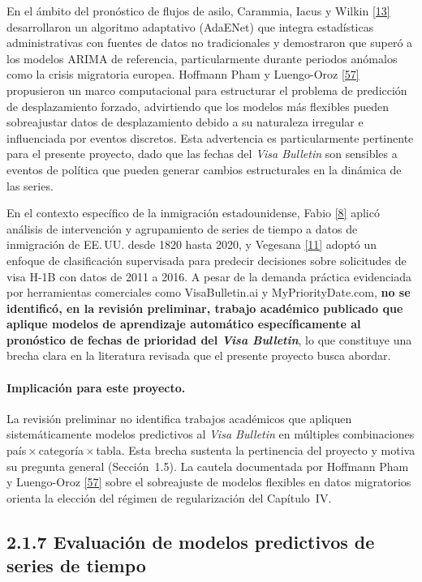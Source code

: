 \documentclass[12pt,letterpaper]{report}
\newcommand{\cita}[1]{\hyperref[bib:#1]{[#1]}}
\begin{document}
En el ámbito del pronóstico de flujos de asilo, Carammia, Iacus y Wilkin \cita{13} desarrollaron un algoritmo adaptativo (AdaENet) que integra estadísticas administrativas con fuentes de datos no tradicionales y demostraron que superó a los modelos ARIMA de referencia, particularmente durante periodos anómalos como la crisis migratoria europea. Hoffmann Pham y Luengo-Oroz \cita{57} propusieron un marco computacional para estructurar el problema de predicción de desplazamiento forzado, advirtiendo que los modelos más flexibles pueden sobreajustar datos de desplazamiento debido a su naturaleza irregular e influenciada por eventos discretos. Esta advertencia es particularmente pertinente para el presente proyecto, dado que las fechas del \textit{Visa Bulletin} son sensibles a eventos de política que pueden generar cambios estructurales en la dinámica de las series.

En el contexto específico de la inmigración estadounidense, Fabio \cita{8} aplicó análisis de intervención y agrupamiento de series de tiempo a datos de inmigración de EE.\,UU. desde 1820 hasta 2020, y Vegesana \cita{11} adoptó un enfoque de clasificación supervisada para predecir decisiones sobre solicitudes de visa H-1B con datos de 2011 a 2016. A pesar de la demanda práctica evidenciada por herramientas comerciales como VisaBulletin.ai y MyPriorityDate.com, \textbf{no se identificó, en la revisión preliminar, trabajo académico publicado que aplique modelos de aprendizaje automático específicamente al pronóstico de fechas de prioridad del \textit{Visa Bulletin}}, lo que constituye una brecha clara en la literatura revisada que el presente proyecto busca abordar.

\paragraph{Implicación para este proyecto.} La revisión preliminar no identifica trabajos académicos que apliquen sistemáticamente modelos predictivos al \textit{Visa Bulletin} en múltiples combinaciones país\,$\times$\,categoría\,$\times$\,tabla. Esta brecha sustenta la pertinencia del proyecto y motiva su pregunta general (Sección~1.5). La cautela documentada por Hoffmann Pham y Luengo-Oroz \cita{57} sobre el sobreajuste de modelos flexibles en datos migratorios orienta la elección del régimen de regularización del Capítulo~IV.

\subsection{2.1.7 Evaluación de modelos predictivos de series de tiempo}
\end{document}

